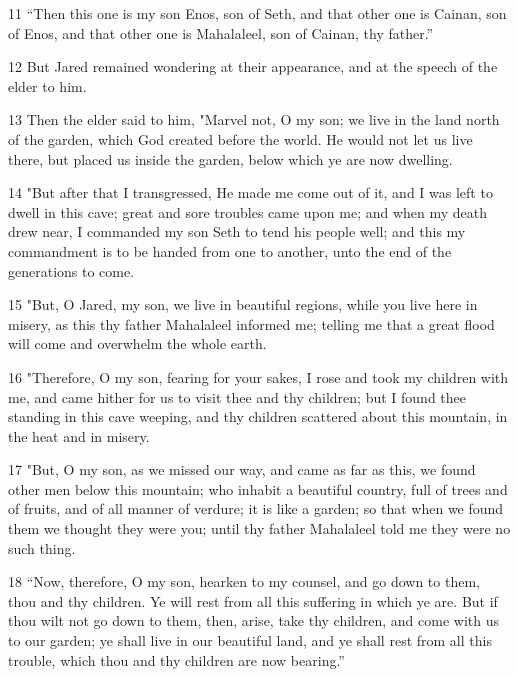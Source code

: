 \par 11 “Then this one is my son Enos, son of Seth, and that other one is Cainan, son of Enos, and that other one is Mahalaleel, son of Cainan, thy father.”

\par 12 But Jared remained wondering at their appearance, and at the speech of the elder to him.

\par 13 Then the elder said to him, "Marvel not, O my son; we live in the land north of the garden, which God created before the world. He would not let us live there, but placed us inside the garden, below which ye are now dwelling.

\par 14 "But after that I transgressed, He made me come out of it, and I was left to dwell in this cave; great and sore troubles came upon me; and when my death drew near, I commanded my son Seth to tend his people well; and this my commandment is to be handed from one to another, unto the end of the generations to come.

\par 15 "But, O Jared, my son, we live in beautiful regions, while you live here in misery, as this thy father Mahalaleel informed me; telling me that a great flood will come and overwhelm the whole earth.

\par 16 "Therefore, O my son, fearing for your sakes, I rose and took my children with me, and came hither for us to visit thee and thy children; but I found thee standing in this cave weeping, and thy children scattered about this mountain, in the heat and in misery.

\par 17 "But, O my son, as we missed our way, and came as far as this, we found other men below this mountain; who inhabit a beautiful country, full of trees and of fruits, and of all manner of verdure; it is like a garden; so that when we found them we thought they were you; until thy father Mahalaleel told me they were no such thing.

\par 18 “Now, therefore, O my son, hearken to my counsel, and go down to them, thou and thy children. Ye will rest from all this suffering in which ye are. But if thou wilt not go down to them, then, arise, take thy children, and come with us to our garden; ye shall live in our beautiful land, and ye shall rest from all this trouble, which thou and thy children are now bearing.”

